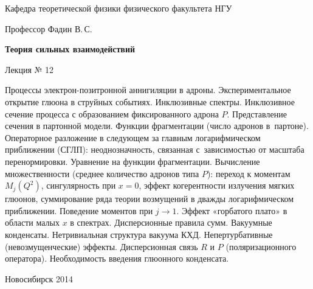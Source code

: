 \documentclass[12pt,pagesize,paper=landscape,paper=192mm:108mm]{scrbook}
\begin{document}
\begin{titlepage}
\begin{center}
    Кафедра теоретической физики физического факультета НГУ

    \large
    Профессор Фадин В.\,С.
    \vspace{-0.5em}

    \huge
    \textbf{Теория сильных взаимодействий}
    
    \Large
    Лекция № 12
    \vfill
    
    \normalsize
    \begin{minipage}{0.93\linewidth}
      \small Процессы электрон-позитронной аннигиляции в
      адроны. Экспериментальное открытие глюона в струйных
      событиях. Инклюзивные спектры. Инклюзивное сечение процесса с
      образованием фиксированного адрона $P$. Представление сечения в
      партонной модели. Функции фрагментации (число адронов
      в~партоне). Операторное разложение в следующем за главным
      логарифмическом приближении (СГЛП): неоднозначность, связанная
      с~зависимостью от масштаба перенормировки. Уравнение на функции
      фрагментации. Вычисление множественности (среднее количество
      адронов типа $P$): переход к моментам $M_j(Q^2)$, сингулярность
      при $x=0$, эффект когерентности излучения мягких глюонов,
      суммирование ряда теории возмущений в дважды логарифмическом
      приближении. Поведение моментов при $j\to 1$. Эффект «горбатого
      плато» в области малых $x$ в спектрах. Дисперсионные правила
      сумм. Вакуумные конденсаты. Нетривиальная структура вакуума
      КХД. Непертурбативные (невозмущенческие) эффекты. Дисперсионная
      связь $R$ и $P$ (поляризационного оператора). Необходимость
      введения глюонного конденсата.
    \end{minipage}
    \vfill
    
    \normalsize \ccbysa\hspace{0.5em} Новосибирск 2014   
  \end{center}
\end{titlepage}
\end{document}
